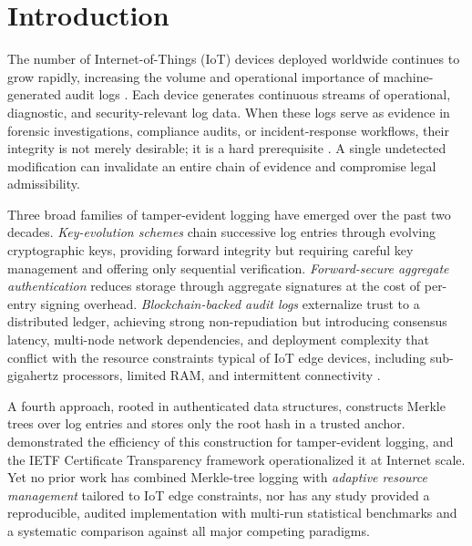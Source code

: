 \documentclass[preprint,12pt]{elsarticle}
\begin{document}
\section{Introduction}
\label{sec:intro}

The number of Internet-of-Things (IoT) devices deployed worldwide continues to grow rapidly, increasing the volume and operational importance of machine-generated audit logs \citep{hassan2019survey,nist2020iot}.
Each device generates continuous streams of operational, diagnostic, and security-relevant log data.
When these logs serve as evidence in forensic investigations, compliance audits, or incident-response workflows, their integrity is not merely desirable; it is a hard prerequisite \citep{kebande2020novel}.
A single undetected modification can invalidate an entire chain of evidence and compromise legal admissibility.

Three broad families of tamper-evident logging have emerged over the past two decades.
\emph{Key-evolution schemes} \citep{schneier1999secure} chain successive log entries through evolving cryptographic keys, providing forward integrity but requiring careful key management and offering only sequential verification.
\emph{Forward-secure aggregate authentication} \citep{ma2009new,yavuz2012efficient} reduces storage through aggregate signatures at the cost of per-entry signing overhead.
\emph{Blockchain-backed audit logs} \citep{putz2019secure,ahmad2019blockaudit} externalize trust to a distributed ledger, achieving strong non-repudiation but introducing consensus latency, multi-node network dependencies, and deployment complexity that conflict with the resource constraints typical of IoT edge devices, including sub-gigahertz processors, limited RAM, and intermittent connectivity \citep{hassan2019survey,nist2020iot}.

A fourth approach, rooted in authenticated data structures, constructs Merkle trees \citep{merkle1987digital} over log entries and stores only the root hash in a trusted anchor.
\citet{crosby2009efficient} demonstrated the efficiency of this construction for tamper-evident logging, and the IETF Certificate Transparency framework \citep{rfc9162} operationalized it at Internet scale.
Yet no prior work has combined Merkle-tree logging with \emph{adaptive resource management} tailored to IoT edge constraints, nor has any study provided a reproducible, audited implementation with multi-run statistical benchmarks and a systematic comparison against all major competing paradigms.
\end{document}
